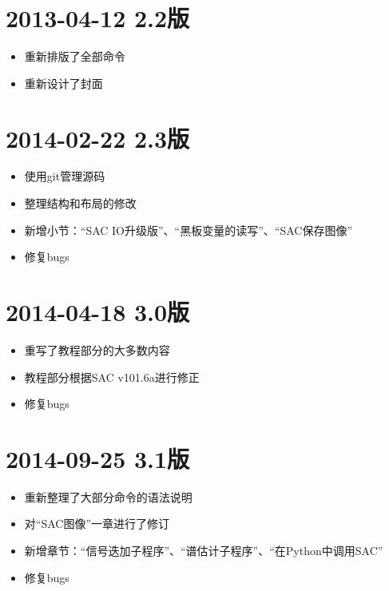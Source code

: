 \section*{2013-04-12 2.2版}
\begin{itemize}
\item 重新排版了全部命令
\item 重新设计了封面
\end{itemize}

\section*{2014-02-22 2.3版}
\begin{itemize}
\item 使用git管理源码
\item 整理结构和布局的修改
\item 新增小节：``SAC IO升级版''、``黑板变量的读写''、``SAC保存图像''
\item 修复bugs
\end{itemize}

\section*{2014-04-18 3.0版}
\begin{itemize}
\item 重写了教程部分的大多数内容
\item 教程部分根据SAC v101.6a进行修正
\item 修复bugs
\end{itemize}

\section*{2014-09-25 3.1版}
\begin{itemize}
\item 重新整理了大部分命令的语法说明
\item 对``SAC图像''一章进行了修订
\item 新增章节：``信号迭加子程序''、``谱估计子程序''、``在Python中调用SAC''
\item 修复bugs
\end{itemize}

